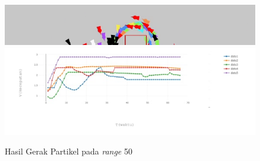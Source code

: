 \begin{figure}
\centering
\includegraphics[scale=0.6]{gambar/hasilntukdibandingkankim2.PNG}
\includegraphics[scale=0.7]{gambar/datagrafik/range50heterogen}
\caption{Hasil Gerak Partikel pada \textit{range} 50}
\label{fig:dominanrange50}
\end{figure}

